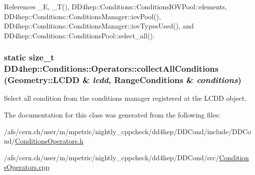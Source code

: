 References \_\-E, \_\-T(), DD4hep::Conditions::ConditionsIOVPool::elements, DD4hep::Conditions::ConditionsManager::iovPool(), DD4hep::Conditions::ConditionsManager::iovTypesUsed(), and DD4hep::Conditions::ConditionsPool::select\_\-all().\hypertarget{class_d_d4hep_1_1_conditions_1_1_operators_a68d6967f27827cfb1fd149228c927c93}{
\subsubsection[{collectAllConditions}]{\setlength{\rightskip}{0pt plus 5cm}static size\_\-t DD4hep::Conditions::Operators::collectAllConditions ({\bf Geometry::LCDD} \& {\em lcdd}, \/  {\bf RangeConditions} \& {\em conditions})}}
\label{class_d_d4hep_1_1_conditions_1_1_operators_a68d6967f27827cfb1fd149228c927c93}


Select all condition from the conditions manager registered at the LCDD object. 

The documentation for this class was generated from the following files:\begin{DoxyCompactItemize}
\item 
/afs/cern.ch/user/m/mpetric/nightly\_\-cppcheck/dd4hep/DDCond/include/DDCond/\hyperlink{_conditions_operators_8h}{ConditionsOperators.h}\item 
/afs/cern.ch/user/m/mpetric/nightly\_\-cppcheck/dd4hep/DDCond/src/\hyperlink{_conditions_operators_8cpp}{ConditionsOperators.cpp}\end{DoxyCompactItemize}
